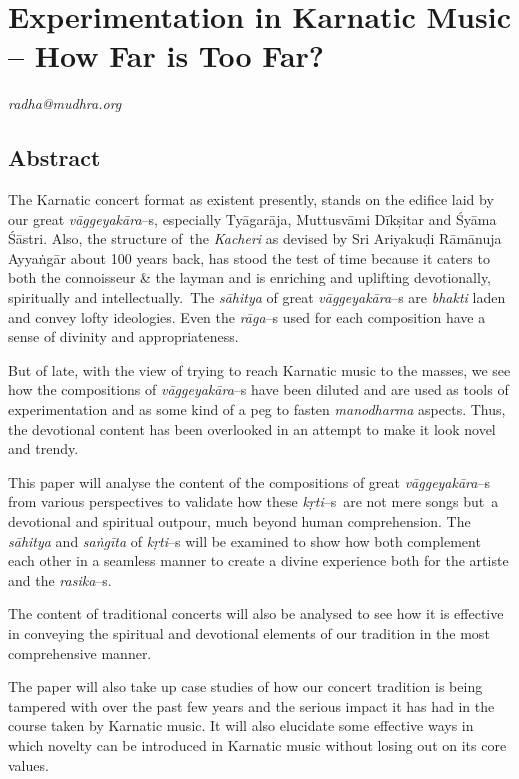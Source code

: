 
\chapter{Experimentation in Karnatic Music – How Far is Too Far?}\label{chapter4}


\begin{flushright}
\textit{radha@mudhra.org}
\end{flushright}


\section*{Abstract}

The Karnatic concert format as existent presently, stands on the edifice laid by our great \textit{vāggeyakāra}–s, especially Tyāgarāja, Muttusvāmi Dīkṣitar and Śyāma Śāstri. Also, the structure of the \textit{Kacheri} as devised by Sri Ariyakuḍi Rāmānuja Ayyaṅgār about 100 years back, has stood the test of time because it caters to both the connoisseur \& the layman and is enriching and uplifting devotionally, spiritually and intellectually. The \textit{sāhitya} of great \textit{vāggeyakāra}–s are \textit{bhakti} laden and convey lofty ideologies. Even the \textit{rāga}–s used for each composition have a sense of divinity and appropriateness.

But of late, with the view of trying to reach Karnatic music to the masses, we see how the compositions of \textit{vāggeyakāra}–s have been diluted and are used as tools of experimentation and as some kind of a peg to fasten \textit{manodharma} aspects. Thus, the devotional content has been overlooked in an attempt to make it look novel and trendy.

This paper will analyse the content of the compositions of great \textit{vāggeyakāra}–s from various perspectives to validate how these \textit{kṛti}–s are not mere songs but a devotional and spiritual outpour, much beyond human comprehension. The \textit{sāhitya} and \textit{saṅgīta} of \textit{kṛti}–s will be examined to show how both complement each other in a seamless manner to create a divine experience both for the artiste and the \textit{rasika}–s.

The content of traditional concerts will also be analysed to see how it is effective in conveying the spiritual and devotional elements of our tradition in the most comprehensive manner.

The paper will also take up case studies of how our concert tradition is being tampered with over the past few years and the serious impact it has had in the course taken by Karnatic music. It will also elucidate some effective ways in which novelty can be introduced in Karnatic music without losing out on its core values.


